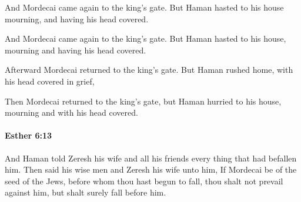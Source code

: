 			And Mordecai came again to the king’s gate. But Haman hasted to his house mourning, and having his head covered.

			\begin{versebox}
					\item[BHS] 
					\item[LXX] 
					\item[ASV] And Mordecai came again to the king's gate. But Haman hasted to his house, mourning and having his head covered.
					\item[NIV] Afterward Mordecai returned to the king’s gate. But Haman rushed home, with his head covered in grief,
					\item[NRSV] Then Mordecai returned to the king’s gate, but Haman hurried to his house, mourning and with his head covered.
			\end{versebox}

		\paragraph{Esther 6:13} %
			\label{ESTHER-6-13}

			And Haman told Zeresh his wife and all his friends every thing that had befallen him. Then said his wise men and Zeresh his wife unto him, If Mordecai be of the seed of the Jews, before whom thou hast begun to fall, thou shalt not prevail against him, but shalt surely fall before him.

